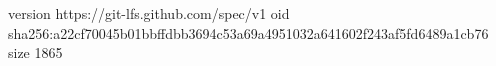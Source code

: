 version https://git-lfs.github.com/spec/v1
oid sha256:a22cf70045b01bbffdbb3694c53a69a4951032a641602f243af5fd6489a1cb76
size 1865

